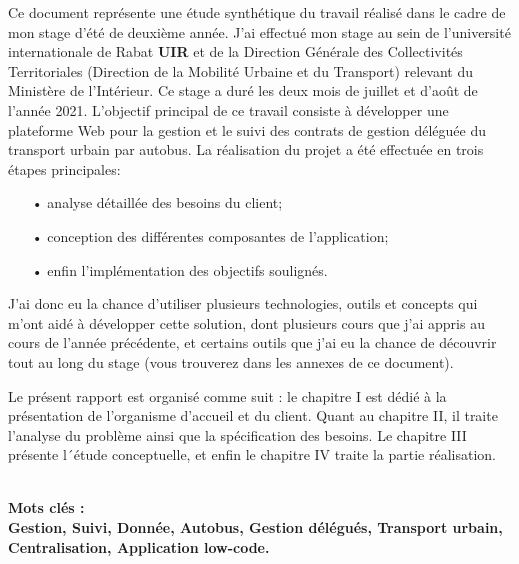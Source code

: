 Ce document représente une étude synthétique du travail réalisé dans le
cadre de mon stage d'été de deuxième année. J'ai effectué mon stage au sein de
l'université internationale de Rabat \textbf{UIR}  et de la Direction Générale des Collectivités Territoriales (Direction de la Mobilité Urbaine et du Transport) relevant du Ministère de l’Intérieur. Ce stage a duré les deux
mois de juillet et d'août de l'année 2021. L’objectif principal de ce travail
consiste à développer une plateforme Web pour la gestion et le suivi des
contrats de gestion déléguée du transport urbain par autobus. La réalisation du projet a été effectuée en trois étapes principales:
\begin{itemize}
	\item[•] analyse détaillée des besoins du client;
	\item[•] conception des différentes composantes de l'application;
	\item[•] enfin l'implémentation des objectifs soulignés.
\end{itemize}
J'ai donc eu la chance d'utiliser plusieurs technologies, outils et concepts qui m'ont aidé à développer cette solution, dont plusieurs cours que j'ai appris au cours de l'année précédente, et certains outils que j'ai eu la chance de découvrir tout au long du stage (vous trouverez dans les annexes de ce document).

Le présent rapport est organisé comme suit : le chapitre I est dédié à
la présentation de
l’organisme d’accueil et du client. Quant au chapitre II, il traite
l’analyse du problème ainsi que la spécification des besoins. Le
chapitre III présente l´étude conceptuelle, et enfin le chapitre IV traite la
partie réalisation.

\textbf	{\\Mots clés :\\ Gestion, Suivi, Donnée, Autobus, Gestion  délégués,
	Transport urbain, Centralisation, Application low-code.}

